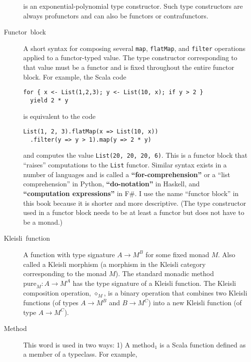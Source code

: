 \begin{description}
is an exponential-polynomial type constructor. Such type constructors
are always profunctors and can also be functors or contrafunctors.
\item [{\index{functor block}Functor~block}] A short syntax for composing
several \lstinline!map!, \lstinline!flatMap!, and \lstinline!filter!
operations applied to a functor-typed value. The type constructor
corresponding to that value must be a functor and is fixed throughout
the entire functor block. For example, the Scala code
\begin{lstlisting}
for { x <- List(1,2,3); y <- List(10, x); if y > 2 }
  yield 2 * y
\end{lstlisting}
is equivalent to the code
\begin{lstlisting}
List(1, 2, 3).flatMap(x => List(10, x))
  .filter(y => y > 1).map(y => 2 * y)
\end{lstlisting}
and computes the value \lstinline!List(20, 20, 20, 6)!. This is a
functor block that \textsf{``}raises\textsf{''} computations to the \lstinline!List!
functor. Similar syntax exists in a number of languages and is called
a \textbf{\textsf{``}for-comprehension\textsf{''}}
or a \textsf{``}list comprehension\textsf{''} in Python, \textbf{\textsf{``}do-notation\textsf{''}}
in Haskell, and \textbf{\textsf{``}computation expressions\textsf{''}}
in F\#. I use the name \textsf{``}functor block\textsf{''} in this book because it
is shorter and more descriptive. (The type constructor used in a functor
block needs to be at least a functor but does not have to be a monad.)
\item [{Kleisli~function}]  A function with
type signature $A\rightarrow M^{B}$ for some fixed monad $M$. Also
called a Kleisli morphism (a morphism in
the Kleisli category corresponding to the monad $M$). The standard
monadic method $\text{pure}_{M}:A\rightarrow M^{A}$ has the type
signature of a Kleisli function. The Kleisli composition operation,
$\diamond_{M}$, is a binary operation that combines two Kleisli functions
(of types $A\rightarrow M^{B}$ and $B\rightarrow M^{C}$) into a
new Kleisli function (of type $A\rightarrow M^{C}$).
\item [{\index{method}Method}] This word is used in two ways: 1) A method$_{1}$
is a Scala function defined as a member of a typeclass. For example,

\end{description}
